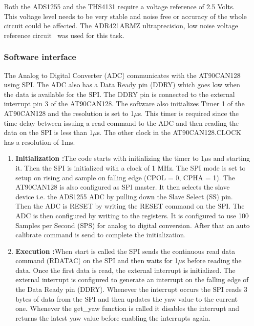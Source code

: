 Both the ADS1255 and the THS4131 require a voltage reference of 2.5 Volts. This voltage level needs to be very stable and noise free or accuracy of the whole circuit could be affected. The ADR421ARMZ ultraprecision, low noise voltage reference circuit~\cite{web:adr421} was used for this task.

\subsubsection{Software interface}
The Analog to Digital Converter (ADC) communicates with the AT90CAN128 using SPI. The ADC also has a Data Ready pin (DDRY) which goes low when the data is available for the SPI. The DDRY pin is connected to the external interrupt pin 3 of the AT90CAN128. The software also initializes Timer 1 of the AT90CAN128 and the resolution is set to 1$\mu$s. This timer is required since the time delay between issuing a read command to the ADC and then reading the data on the SPI is less than 1$\mu$s. The other clock in the AT90CAN128.CLOCK has a resolution of 1ms.
\begin{enumerate}
\item \textbf{Initialization :}The code starts with initializing the timer to 1$\mu$s and starting it. Then the SPI is initialized with a clock of 1 MHz. The SPI mode is set to setup on rising and sample on falling edge (CPOL = 0, CPHA = 1). The AT90CAN128 is also configured as SPI master. It then selects the slave device i.e. the ADS1255 ADC by pulling down the Slave Select (SS) pin. Then the ADC is RESET by writing the RESET command on the SPI. The ADC is then configured by writing to the registers. It is configured to use 100 Samples per Second (SPS) for analog to digital conversion. After that an auto calibrate command is send to complete the initialization. 
\item \textbf{Execution :}When start is called the SPI sends the continuous read data command (RDATAC) on the SPI and then waits for 1$\mu$s before reading the data. Once the first data is read, the external interrupt is initialized. The external interrupt is configured to generate an interrupt on the falling edge of the Data Ready pin (DDRY). Whenever the interrupt occurs the SPI reads 3 bytes of data from the SPI and then updates the yaw value to the current one. Whenever the get\_yaw function is called it disables the interrupt and returns the latest yaw value before enabling the interrupts again.
\end{enumerate}
\newpage

